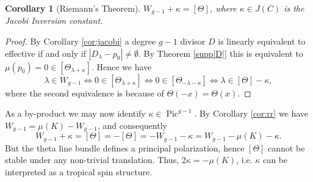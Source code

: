\documentclass[12pt]{amsart}
\theoremstyle{plain}
\newtheorem{corollary}[theorem]{Corollary}
\theoremstyle{definition}
\theoremstyle{remark}
\newcommand{\<}{\langle}   %
\renewcommand{\>}{\rangle} %
\newcommand{\Pic}{\operatorname{Pic}}
\begin{document}
\begin{corollary}[Riemann's Theorem]\label{thm:riemann}
$W_{g-1}+\kappa=[\Theta]$, where $\kappa\in J(C)$ is the Jacobi Inversion constant.
\end{corollary}

\begin{proof}
By Corollary \ref{cor:jacobi} a degree $g-1$ divisor $D$ is linearly equivalent to effective if and only if $|D_\lambda-p_0|\ne \emptyset$. By Theorem \ref{supp|D|} this is equivalent to $\mu(p_0)=0 \in   [\Theta_{\lambda+\kappa}] $. Hence we have
$$\lambda\in W_{g-1} \Longleftrightarrow
0 \in [\Theta_{\lambda+\kappa}] \Longleftrightarrow
0 \in [\Theta_{-\lambda-\kappa}] \Longleftrightarrow
\lambda \in [\Theta]-\kappa,
$$
where the second equivalence is because of $\Theta(-x)=\Theta(x)$.
\end{proof}

As a by-product we may now identify $\kappa\in\Pic^{g-1}$. By Corollary \ref{cor:rr} we have $W_{g-1}=\mu(K)-W_{g-1}$, and consequently
$$W_{g-1}+\kappa=[\Theta]=-[\Theta]=-W_{g-1}-\kappa=W_{g-1}-\mu(K)-\kappa.$$
But the theta line bundle defines a principal polarization, hence $[\Theta]$
cannot be stable under any non-trivial translation. Thus, $2\kappa=-\mu(K)$,
i.e. $\kappa$ can be interpreted as a tropical spin structure.






\end{document}
